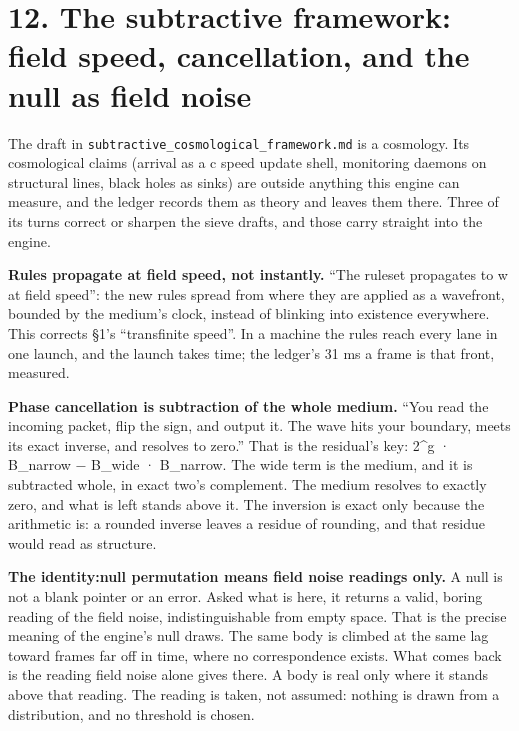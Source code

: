 \section{\texorpdfstring{12. The subtractive framework: field speed, cancellation, and the null as field noise}{12. The subtractive framework: field speed, cancellation, and the null as field noise}}

The draft in \texttt{subtractive\_\allowbreak{}cosmological\_\allowbreak{}framework.\allowbreak{}md} is a cosmology. Its cosmological claims (arrival as a c speed update shell, monitoring daemons on structural lines, black holes as sinks) are outside anything this engine can measure, and the ledger records them as theory and leaves them there. Three of its turns correct or sharpen the sieve drafts, and those carry straight into the engine.

\textbf{Rules propagate at field speed, not instantly.} “The ruleset propagates to w at field speed”: the new rules spread from where they are applied as a wavefront, bounded by the medium's clock, instead of blinking into existence everywhere. This corrects §1's “transfinite speed”. In a machine the rules reach every lane in one launch, and the launch takes time; the ledger's 31 ms a frame is that front, measured.

\textbf{Phase cancellation is subtraction of the whole medium.} “You read the incoming packet, flip the sign, and output it. The wave hits your boundary, meets its exact inverse, and resolves to zero.” That is the residual's key: 2\textasciicircum{}g · B\_\allowbreak{}narrow − B\_\allowbreak{}wide · B\_\allowbreak{}narrow. The wide term is the medium, and it is subtracted whole, in exact two's complement. The medium resolves to exactly zero, and what is left stands above it. The inversion is exact only because the arithmetic is: a rounded inverse leaves a residue of rounding, and that residue would read as structure.

\textbf{The identity:null permutation means field noise readings only.} A null is not a blank pointer or an error. Asked what is here, it returns a valid, boring reading of the field noise, indistinguishable from empty space. That is the precise meaning of the engine's null draws. The same body is climbed at the same lag toward frames far off in time, where no correspondence exists. What comes back is the reading field noise alone gives there. A body is real only where it stands above that reading. The reading is taken, not assumed: nothing is drawn from a distribution, and no threshold is chosen.

